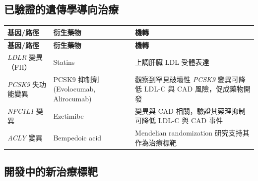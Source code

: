 \documentclass[12pt,a4paper]{article}
\begin{document}
\subsection{已驗證的遺傳學導向治療}

\begin{longtable}{p{3cm}p{3.5cm}p{7cm}}
\toprule
\textbf{基因/路徑} & \textbf{衍生藥物} & \textbf{機轉} \\
\midrule
\endfirsthead

\toprule
\textbf{基因/路徑} & \textbf{衍生藥物} & \textbf{機轉} \\
\midrule
\endhead

\bottomrule
\endfoot

\textit{LDLR} 變異（FH） & Statins & 上調肝臟 LDL 受體表達 \\
\midrule
\textit{PCSK9} 失功能變異 & PCSK9 抑制劑\newline (Evolocumab, Alirocumab) & 觀察到罕見破壞性 \textit{PCSK9} 變異可降低 LDL-C 與 CAD 風險，促成藥物開發 \\
\midrule
\textit{NPC1L1} 變異 & Ezetimibe & 變異與 CAD 相關，驗證其藥理抑制可降低 LDL-C 與 CAD 事件 \\
\midrule
\textit{ACLY} 變異 & Bempedoic acid & Mendelian randomization 研究支持其作為治療標靶 \\
\bottomrule
\end{longtable}

\subsection{開發中的新治療標靶}
\end{document}
